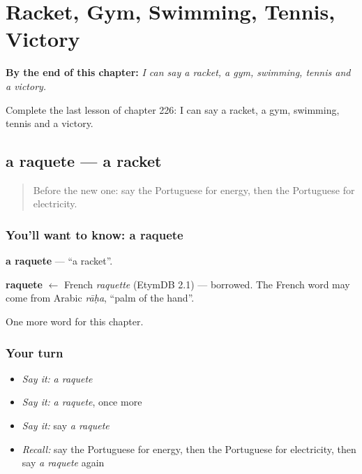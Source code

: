 
\chapter{Racket, Gym, Swimming, Tennis, Victory}
\label{ch:pt-racket-gym-swimming-tennis-victory}

\begin{chapteropening}
\textbf{By the end of this chapter:} \emph{I can say a racket, a gym, swimming, tennis and a victory.}

Complete the last lesson of chapter 226: I can say a racket, a gym, swimming, tennis and a victory.
\end{chapteropening}

\section[a raquete]{a raquete — a racket}

\label{lesson:PT-C226-raquete}



\begin{quote}
Before the new one: say the Portuguese for energy, then the Portuguese for electricity.
\end{quote}

\subsection*{You'll want to know: a raquete}
\textbf{a raquete} — \textquotedblleft{}a racket\textquotedblright{}.

\begin{cousinweb}
\textbf{raquete} $\leftarrow$ French \emph{raquette} (EtymDB 2.1) — borrowed. The French word may come from Arabic \emph{rāḥa}, \textquotedblleft{}palm of the hand\textquotedblright{}.
\end{cousinweb}

\begin{grammarlens}[title={What you've built}]
One more word for this chapter.
\end{grammarlens}

\subsection*{Your turn}
\begin{itemize}
\raggedright
  \item \emph{Say it:} \emph{a raquete}
  \item \emph{Say it:} \emph{a raquete}, once more
  \item \emph{Say it:} say \emph{a raquete}
  \item \emph{Recall:} say the Portuguese for energy, then the Portuguese for electricity, then say \emph{a raquete} again
\end{itemize}

